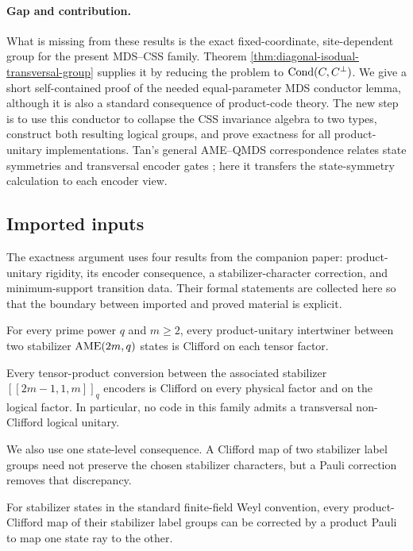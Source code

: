 \paragraph{Gap and contribution.}
What is missing from these results is the exact fixed-coordinate,
site-dependent group for the present MDS--CSS family.  Theorem
\ref{thm:diagonal-isodual-transversal-group} supplies it by reducing the
problem to \(\operatorname{Cond}(C,C^\perp)\).  We give a short self-contained proof of the
needed equal-parameter MDS conductor lemma, although it is also a standard
consequence of product-code theory.  The new step is to use this conductor to
collapse the CSS invariance algebra to two types, construct both resulting
logical groups, and prove exactness for all product-unitary implementations.
Tan's general AME--QMDS correspondence
relates state symmetries and transversal encoder gates
\cite[Theorems~3.5--3.6]{Tan2026}; here it transfers the state-symmetry
calculation to each encoder view.

\subsection*{Imported inputs}

The exactness argument uses four results from the companion paper:
product-unitary rigidity, its encoder consequence, a stabilizer-character
correction, and minimum-support transition data.  Their formal statements are
collected here so that the boundary between imported and proved material is
explicit.

\begin{theorem}
\label{thm:lu-lc-rigidity}
For every prime power \(q\) and \(m\geq2\), every product-unitary
intertwiner between two stabilizer \(\mathrm{AME}(2m,q)\) states is Clifford on each
tensor factor.
\end{theorem}

\begin{corollary}
\label{cor:transversal-clifford}
Every tensor-product conversion between the associated stabilizer
\([[2m-1,1,m]]_q\) encoders is Clifford on every physical factor and on the
logical factor.  In particular, no code in this family admits a transversal
non-Clifford logical unitary.
\end{corollary}

We also use one state-level consequence.  A Clifford map of two stabilizer
label groups need not preserve the chosen stabilizer characters, but a Pauli
correction removes that discrepancy.
\begin{lemma}
\label{lem:pauli-phase-correction}
For stabilizer states in the standard finite-field Weyl convention, every
product-Clifford map of their stabilizer label groups can be corrected by a
product Pauli to map one state ray to the other.
\end{lemma}

